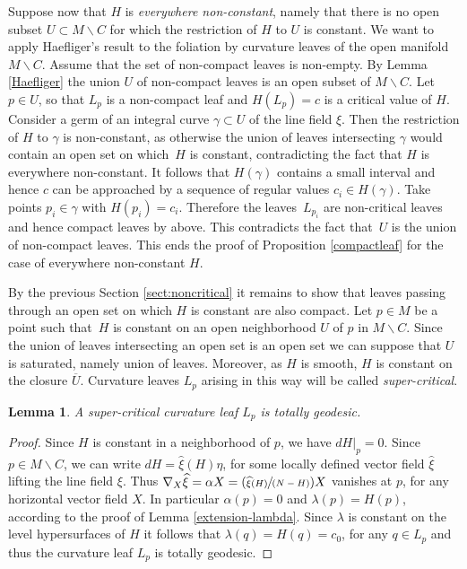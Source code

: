 \documentclass[JEP,XML,SOM,Unicode]{cedram}
\let\moins\smallsetminus
\newcommand{\Pspfrac}[2]{(\sfrac{#1}{(#2)})}
\newtheorem{lemma}[theorem]{Lemma}
\theoremstyle{definition}
\theoremstyle{remark}
\numberwithin{equation}{section}
\begin{document}
Suppose now that $H$ is \emph{everywhere non-constant}, namely that
there is no open subset $U\subset M\moins C$ for which the restriction of $H$ to $U$ is constant.
We want to apply Haefliger's result to the foliation by curvature leaves of the open manifold $M\moins C$.
Assume that the set of non-compact leaves is non-empty.
By Lemma \ref{Haefliger} the union $U$ of non-compact leaves is an open subset of $M\moins C$.
Let $p\in U$, so that $L_p$ is a non-compact leaf and $H(L_p)=c$ is a critical value of $H$.
Consider a germ of an integral curve $\gamma\subset U$ of the line field $\xi$. Then the restriction of $H$ to $\gamma$ is non-constant, as
otherwise the union of leaves intersecting $\gamma$ would contain an open set on which~$H$ is constant, contradicting the fact that $H$ is everywhere non-constant.
It follows that $H(\gamma)$ contains a small interval and hence $c$ can be approached by a sequence of regular values $c_i\in H(\gamma)$.
Take points $p_i\in \gamma$ with $H(p_i)=c_i$. Therefore the leaves~$L_{p_i}$ are non-critical leaves and hence compact leaves by above.
This contradicts the fact that~$U$ is the union of non-compact leaves.
This ends the proof of Proposition \ref{compactleaf} for the case of everywhere non-constant $H$.

\label{sect:constant}
By the previous Section \ref{sect:noncritical} it remains to show that leaves passing through an open set on which $H$ is constant are also
compact. Let $p\in M$ be a point such that~$H$ is constant on an open neighborhood $U$ of $p$ in $M\moins C$.
Since the union of leaves intersecting an open set is an open set we can suppose that $U$ is saturated, namely union of leaves.
Moreover, as $H$ is smooth, $H$ is constant on the closure $\overline{U}$.
Curvature leaves $L_p$ arising in this way will be called \emph{super-critical}.

\begin{lemma}\label{totallygeodesic}
A super-critical curvature leaf $L_p$ is totally geodesic.
\end{lemma}
\begin{proof}
Since $H$ is constant in a neighborhood of $p$, we have $dH|_p=0$. Since $p\in M\moins C$, we can write
$dH=\widehat{\xi}(H) \eta$, for some locally defined
vector field $\widehat{\xi}$ lifting the line field $\xi$. Thus
$\nabla_X\widehat{\xi}=\alpha X=\Pspfrac{\widehat{\xi}(H)}{N-H} X$ vanishes at $p$, for any
horizontal vector field $X$. In particular $\alpha(p)=0$ and
$\lambda(p)=H(p)$, according to the proof of Lemma \ref{extension-lambda}.
Since $\lambda$ is constant on the level
hypersurfaces of $H$ it follows that $\lambda(q)=H(q)=c_0$,
for any $q\in L_p$ and thus the curvature leaf $L_p$ is totally geodesic.
\end{proof}
\end{document}
